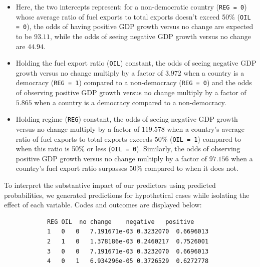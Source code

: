 \documentclass[12pt,letterpaper]{article}
\begin{document}
\begin{enumerate}
		\vspace{0.2cm}
		
		\begin{itemize}
			\setlength{\itemsep}{0.2cm} 
			\item Here, the two intercepts represent: for a non-democratic country (\texttt{REG = 0}) whose average ratio of fuel exports to total exports doesn’t exceed 50\% (\texttt{OIL = 0}), the odds of having positive GDP growth versus no change are expected to be $93.11$, while the odds of seeing negative GDP growth versus no change are $44.94$.
			\item Holding the fuel export ratio (\texttt{OIL}) constant, the odds of seeing negative GDP growth versus no change multiply by a factor of $3.972$ when a country is a democracy (\texttt{REG = 1}) compared to a non-democracy (\texttt{REG = 0}) and the odds of observing positive GDP growth versus no change multiply by a factor of $5.865$ when a country is a democracy compared to a non-democracy.
			\item Holding regime (\texttt{REG}) constant, the odds of seeing negative GDP growth versus no change multiply by a factor of $119.578$ when a country's average ratio of fuel exports to total exports exceeds 50\% (\texttt{OIL = 1}) compared to when this ratio is 50\% or less (\texttt{OIL = 0}). Similarly, the odds of observing positive GDP growth versus no change multiply by a factor of $97.156$ when a country's fuel export ratio surpasses 50\% compared to when it does not.
		\end{itemize}
		
		\vspace{0.4cm}
		
		To interpret the substantive impact of our predictors using predicted probabilities, we generated predictions for hypothetical cases while isolating the effect of each variable. Codes and outcomes are displayed below:
		
		\vspace{0.2cm}
		
		
		
		\begin{verbatim}
			REG OIL  no change    negative   positive
			1   0   0   7.191671e-03 0.3232070  0.6696013
			2   1   0   1.378186e-03 0.2460217  0.7526001
			3   0   0   7.191671e-03 0.3232070  0.6696013
			4   0   1   6.934296e-05 0.3726529  0.6272778
		\end{verbatim} 
		

\end{enumerate}
\end{document}

